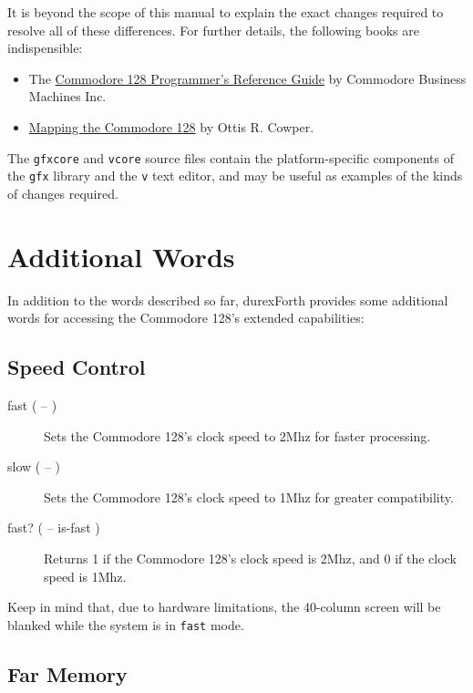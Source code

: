 It is beyond the scope of this manual to explain the exact changes required to resolve all of these differences. For further details, the following books are indispensible:

\begin{itemize}
\item The \href{https://archive.org/details/C128_Programmers_Reference_Guide_1986_Bamtam_Books}{Commodore 128 Programmer’s Reference Guide} by Commodore Business Machines Inc.

\item \href{https://archive.org/details/Compute_s_Mapping_the_Commodore_128/}{Mapping the Commodore 128} by Ottis R. Cowper.
\end{itemize}

The \texttt{gfxcore} and \texttt{vcore} source files contain the platform-specific components of the \texttt{gfx} library and the \texttt{v} text editor, and may be useful as examples of the kinds of changes required.

\section{Additional Words}

In addition to the words described so far, durexForth provides some additional words for accessing the Commodore 128's extended capabilities:

\subsection{Speed Control}

\begin{description}
    \item[fast ( -- )] Sets the Commodore 128's clock speed to 2Mhz for faster processing.
    \item[slow ( -- )] Sets the Commodore 128's clock speed to 1Mhz for greater compatibility.
    \item[fast? ( -- is-fast )] Returns 1 if the Commodore 128's clock speed is 2Mhz, and 0 if the clock speed is 1Mhz.
\end{description}

Keep in mind that, due to hardware limitations, the 40-column screen will be blanked while the system is in \texttt{fast} mode.

\subsection{Far Memory}

